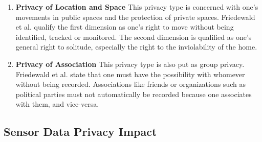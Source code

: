 \documentclass[runningheads,a4paper]{llncs}
\newenvironment{LGContent}
{ \par\color{blue} \it \small }
{ \par }
\begin{document}
\begin{LGContent}
\begin{enumerate}
\item \textbf{Privacy of Location and Space}
This privacy type is concerned with one's movements in public spaces and the protection of private spaces.
Friedewald et al. qualify the first dimension as one's right to move without being identified, tracked or monitored.
The second dimension is qualified as one's general right to solitude, especially the right to the inviolability of the home.


\item \textbf{Privacy of Association}
This privacy type is also put as group privacy.
Friedewald et al. state that one must have the possibility with whomever without being recorded.
Associations like friends or organizations such as political parties must not automatically be recorded because one associates with them, and vice-versa.
\end{enumerate}

\end{LGContent}

\subsection{Sensor Data Privacy Impact}\label{sec:SensorPrivacyImpact}
\end{document}
